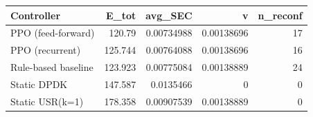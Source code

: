\begin{tabular}{lrrrr}
\toprule
Controller & E_tot & avg_SEC & v & n_reconf \\
\midrule
PPO (feed-forward) & 120.79 & 0.00734988 & 0.00138696 & 17 \\
PPO (recurrent) & 125.744 & 0.00764088 & 0.00138696 & 16 \\
Rule-based baseline & 123.923 & 0.00775084 & 0.00138889 & 24 \\
Static DPDK & 147.587 & 0.0135466 & 0 & 0 \\
Static USR(k=1) & 178.358 & 0.00907539 & 0.00138889 & 0 \\
\bottomrule
\end{tabular}
